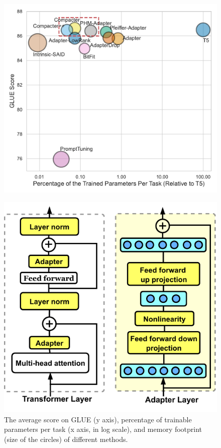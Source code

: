 \documentclass{article}
\begin{document}
\begin{figure}[tp]
\centering
\begin{minipage}[b]{0.6\linewidth}
\centering %
\includegraphics[width=1.0\textwidth, trim={0.2cm 0.48 0.1cm 0.48},clip]{figures/comparison_plot.pdf}
\caption{The average score on GLUE (y axis), percentage of trainable parameters per task (x axis, in log scale), and memory footprint (size of the circles) of different methods.}\vspace{-1.7em} 
\label{fig:comparison} 
\end{minipage}
\hspace{1em}
\begin{minipage}[b]{0.36\linewidth} %
\centering %
\includegraphics[width=1.0\textwidth]{figures/our_method_3.pdf}%

\end{minipage}
\end{figure}
\end{document}
